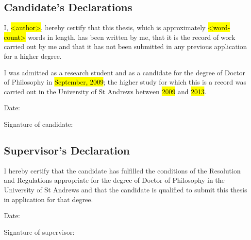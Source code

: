 %
%


\begin{declaration}
\subsection*{Candidate's Declarations}
I, \hl{<author>}, hereby certify that this thesis, which is approximately \hl{<word-count>} words in length, has been written by me, that it is the record of work carried out by me and that it has not been submitted in any previous application for a higher degree.

I was admitted as a research student and as a candidate for the degree of Doctor of Philosophy in \hl{September, 2009}; the higher study for which this is a record was carried out in the University of St Andrews between \hl{2009} and \hl{2013}.
\vspace{24pt}

Date:
\vspace{16pt}

Signature of candidate:
\vspace{48pt}


\subsection*{Supervisor's Declaration}
I hereby certify that the candidate has fulfilled the conditions of the Resolution and Regulations appropriate for the degree of Doctor of Philosophy in the University of St Andrews and that the candidate is qualified to submit this thesis in application for that degree.
\vspace{24pt}

Date:
\vspace{16pt}

Signature of supervisor:
\end{declaration}